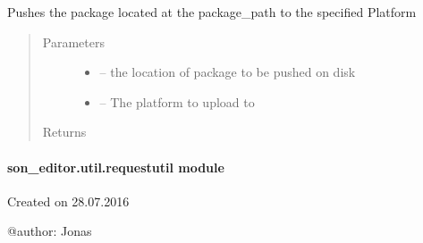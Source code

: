 \documentclass[letterpaper,10pt,english]{sphinxmanual}
\begin{document}

\begin{fulllineitems}
\label{_source/son_editor.util:son_editor.util.publishutil.push_to_platform}
Pushes the package located at the package\_path to the specified Platform
\begin{quote}\begin{description}
\item[{Parameters}] \leavevmode\begin{itemize}
\item {} 
 -- the location of package to be pushed on disk

\item {} 
 -- The platform to upload to

\end{itemize}

\item[{Returns}] \leavevmode


\end{description}\end{quote}

\end{fulllineitems}



\paragraph{son\_editor.util.requestutil module}
\label{_source/son_editor.util:module-son_editor.util.requestutil}\label{_source/son_editor.util:son-editor-util-requestutil-module}
Created on 28.07.2016

@author: Jonas

\begin{fulllineitems}
\label{_source/son_editor.util:son_editor.util.requestutil.get_config}
\end{fulllineitems}

\end{document}
